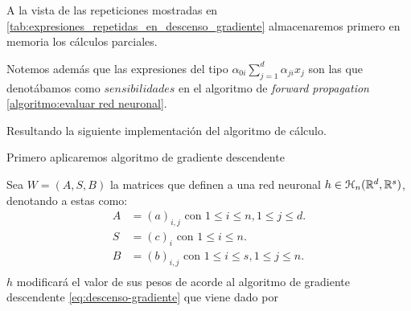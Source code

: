 A la vista de las repeticiones mostradas en  \ref{tab:expresiones_repetidas_en_descenso_gradiente}
almacenaremos primero en memoria los cálculos parciales. 

Notemos además que las expresiones del tipo 
$\alpha_{0 i} \sum_{j=1}^d \alpha_{j i}x_j$  son las que denotábamos como $sensibilidades$ en el algoritmo de \textit{forward propagation} \ref{algoritmo:evaluar red neuronal}.

Resultando la siguiente implementación del algoritmo de cálculo. 

Primero aplicaremos algoritmo de gradiente descendente 

Sea $W = (A,S,B)$ 
la matrices que definen a una red neuronal $h \in \mathcal{H}_n(\mathbb{R}^d,\mathbb{R}^s)$, denotando a estas como: 
\begin{align}
    A &= (a)_{i,j} \text{ con } 1 \leq i \leq n, 1 \leq j \leq d. \\
    S &= (c)_{i} \text{ con } 1 \leq i \leq n. \\
    B &= (b)_{i,j} \text{ con } 1 \leq i \leq s, 1 \leq j \leq n. \\
\end{align}
 $h$ modificará el valor de sus pesos de acorde al algoritmo de gradiente descendente \ref{eq:descenso-gradiente} que viene dado por

